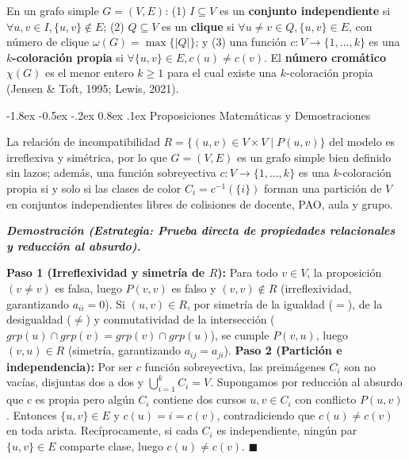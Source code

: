 \documentclass[12pt,a4paper]{article}
\makeatletter
\renewcommand\section{\@startsection {section}{1}{\z@}%
                                   {-1.8ex \@plus -0.5ex \@minus -.2ex}%
                                   {0.8ex \@plus.1ex}%
                                   {\normalfont\large\bfseries}}
\theoremstyle{definition}
\newenvironment{demostracion}[1][Demostración]{%
    \begin{singlespace}\small\noindent\textbf{\textit{#1.}}
}{%
    \hfill$\blacksquare$\end{singlespace}\vspace{0.25em}
}
\makeatother
\begin{document}
\begin{singlespace}
\begin{definicion}
En un grafo simple $G = (V, E)$: (1) $I \subseteq V$ es un \textbf{conjunto independiente} si $\forall u, v \in I, \{u, v\} \notin E$; (2) $Q \subseteq V$ es un \textbf{clique} si $\forall u \neq v \in Q, \{u, v\} \in E$, con número de clique $\omega(G) = \max\{|Q|\}$; y (3) una función $c: V \to \{1, \dots, k\}$ es una \textbf{$k$-coloración propia} si $\forall \{u, v\} \in E, c(u) \neq c(v)$. El \textbf{número cromático} $\chi(G)$ es el menor entero $k \ge 1$ para el cual existe una $k$-coloración propia (Jensen \& Toft, 1995; Lewis, 2021).
\end{definicion}
\end{singlespace}

\section{Proposiciones Matemáticas y Demostraciones}

\begin{singlespace}
\begin{proposicion}
La relación de incompatibilidad $R = \{(u, v) \in V \times V \mid P(u, v)\}$ del modelo es irreflexiva y simétrica, por lo que $G = (V, E)$ es un grafo simple bien definido sin lazos; además, una función sobreyectiva $c: V \to \{1, \dots, k\}$ es una $k$-coloración propia si y solo si las clases de color $C_i = c^{-1}(\{i\})$ forman una partición de $V$ en conjuntos independientes libres de colisiones de docente, PAO, aula y grupo.
\end{proposicion}
\end{singlespace}

\begin{demostracion}[Demostración (Estrategia: Prueba directa de propiedades relacionales y reducción al absurdo)]
\textbf{Paso 1 (Irreflexividad y simetría de $R$):} Para todo $v \in V$, la proposición $(v \neq v)$ es falsa, luego $P(v, v)$ es falso y $(v, v) \notin R$ (irreflexividad, garantizando $a_{ii} = 0$). Si $(u, v) \in R$, por simetría de la igualdad ($=$), de la desigualdad ($\neq$) y conmutatividad de la intersección ($grp(u) \cap grp(v) = grp(v) \cap grp(u)$), se cumple $P(v, u)$, luego $(v, u) \in R$ (simetría, garantizando $a_{ij} = a_{ji}$).
\textbf{Paso 2 (Partición e independencia):} Por ser $c$ función sobreyectiva, las preimágenes $C_i$ son no vacías, disjuntas dos a dos y $\bigcup_{i=1}^k C_i = V$. Supongamos por reducción al absurdo que $c$ es propia pero algún $C_i$ contiene dos cursos $u, v \in C_i$ con conflicto $P(u, v)$. Entonces $\{u, v\} \in E$ y $c(u) = i = c(v)$, contradiciendo que $c(u) \neq c(v)$ en toda arista. Recíprocamente, si cada $C_i$ es independiente, ningún par $\{u, v\} \in E$ comparte clase, luego $c(u) \neq c(v)$.
\end{demostracion}
\end{document}
